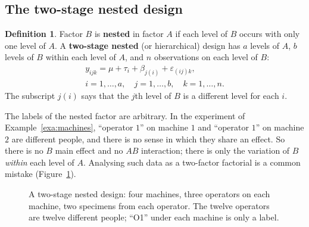 \documentclass[11pt,a4paper]{article}
\numberwithin{equation}{section}
\theoremstyle{definition}
\newtheorem{defn}[thm]{Definition}
\begin{document}
\subsection{The two-stage nested design}
\begin{defn}
Factor $B$ is \textbf{nested} in factor $A$ if each level of $B$ occurs with only one level of $A$. A \textbf{two-stage nested} (or hierarchical) design
has $a$ levels of $A$, $b$ levels of $B$ within each level of $A$, and $n$ observations on each level of $B$:
\begin{gather*}
y_{ijk} = \mu + \tau_i + \beta_{j(i)} + \varepsilon_{(ij)k} , \\
i = 1, \dots, a , \quad j = 1, \dots, b , \quad k = 1, \dots, n .
\end{gather*}
The subscript $j(i)$ says that the $j$th level of $B$ is a different level for each $i$.
\end{defn}

The labels of the nested factor are arbitrary. In the experiment of Example~\ref{exa:machines}, ``operator $1$'' on machine $1$ and ``operator $1$'' on machine $2$
are different people, and there is no sense in which they share an effect. So there is no $B$ main effect and no $AB$ interaction; there is only the
variation of $B$ \emph{within} each level of $A$. Analysing such data as a two-factor factorial is a common mistake (Figure~\ref{fig:nested}).

\begin{figure}[H]
\centering
{}
\caption{A two-stage nested design: four machines, three operators on each machine, two specimens from each operator. The twelve operators are
twelve different people; ``O1'' under each machine is only a label.}
\label{fig:nested}
\end{figure}
\end{document}
